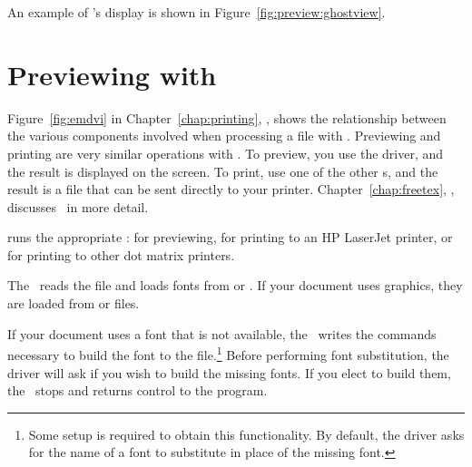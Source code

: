 An example of 's display is shown in
Figure~\ref{fig:preview:ghostview}.


%

\section{Previewing with \protect\emTeX}
\label{preview:emtex}

Figure~\ref{fig:emdvi} in Chapter~\ref{chap:printing},
{\it{}}, shows the relationship between the
various components involved when processing a  file with
\emTeX{}.  Previewing 
and printing are very similar operations with
\emTeX.  To preview, you use the  driver, and the
result is displayed on the screen.  To print, use one of the other
\dvidriver{}s, and the result is a file that can be sent directly to
your printer.
Chapter~\ref{chap:freetex}, {\it{}}, discusses
\emTeX\ in more detail.

 runs the appropriate \dvidriver:
 for previewing,  for
printing to an HP LaserJet printer, or  for printing to
other dot matrix printers.

The \dvidriver\ reads the  file and loads fonts from
 or .  If your document
uses graphics, they are loaded from  or 
 files.

If your document uses a font that is not available, the
\dvidriver\ writes the commands necessary to build the
font to the  file.\footnote{Some setup 
is required to obtain
this functionality.  By default, the driver asks for the name
of a font to substitute in place of the missing font.}  Before
performing font substitution, the driver will ask if you wish
to build the missing fonts.  If you elect to build them, the
\dvidriver\ stops and returns control to the 
program.

